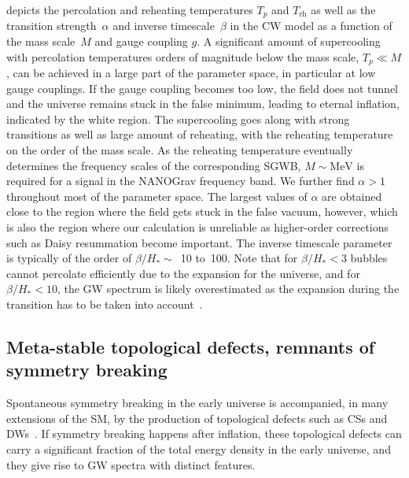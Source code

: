 \documentclass{article}
\newcommand*{\Trh}{\ensuremath{T_\mathrm{rh}}\xspace}
\begin{document}
 depicts the percolation and reheating temperatures $T_p$ and \Trh as well as the transition strength~$\alpha$ and inverse timescale~$\beta$ in the CW model as a function of the mass scale~$M$ and gauge coupling $g$. 
A significant amount of supercooling with percolation temperatures orders of magnitude below the mass scale, $T_p \ll M$, can be achieved in a large part of the parameter space, in particular at low gauge couplings.
If the gauge coupling becomes too low, the field does not tunnel and the universe remains stuck in the false minimum, leading to eternal inflation, indicated by the white region.
The supercooling goes along with strong transitions as well as large amount of reheating, with the reheating temperature on the order of the mass scale. 
As the reheating temperature eventually determines the frequency scales of the corresponding SGWB, $M\sim\si{\MeV}$ is required for a signal in the NANOGrav frequency band.
We further find $\alpha > 1$ throughout most of the parameter space.
The largest values of $\alpha$ are obtained close to the region where the field gets stuck in the false vacuum, however, which is also the region where our calculation is unreliable as higher-order corrections such as Daisy resummation become important.
The inverse timescale parameter is typically of the order of $\beta/H_* \sim$~10 to~100.
Note that for $\beta/H_*<3$ bubbles cannot percolate efficiently due to the expansion for the universe, and for $\beta/H_*<10$, the GW spectrum is likely overestimated as the expansion during the transition has to be taken into account~\cite{Freese:2022qrl,Jinno:2022mie,Bringmann:2023opz}.

\subsection{Meta-stable topological defects, remnants of symmetry breaking}

Spontaneous symmetry breaking in the early universe is accompanied, in many extensions of the SM, by the production of topological defects such as CSs and DWs~\cite{Vilenkin:1984ib,Saikawa:2017hiv}.
If symmetry breaking happens after inflation, these topological defects can carry a significant fraction of the total energy density in the early universe, and they give rise to GW spectra with distinct features.
\end{document}
